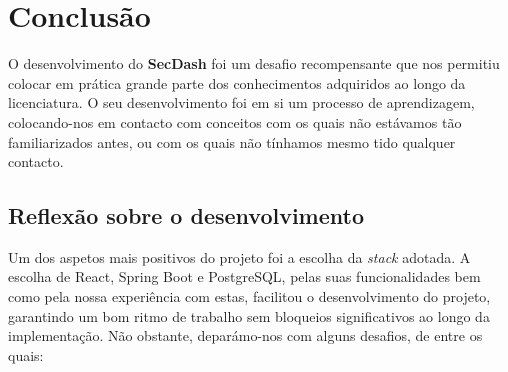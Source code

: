 \chapter{Conclusão} \label{cap:conclusao}

O desenvolvimento do \textbf{SecDash} foi um desafio recompensante que nos permitiu colocar em prática grande parte dos conhecimentos adquiridos ao longo da licenciatura. O seu desenvolvimento foi em si um processo de aprendizagem, colocando-nos em contacto com conceitos com os quais não estávamos tão familiarizados antes, ou com os quais não tínhamos mesmo tido qualquer contacto. \\

\section{Reflexão sobre o desenvolvimento}

Um dos aspetos mais positivos do projeto foi a escolha da \textit{stack} adotada. A escolha de React, Spring Boot e PostgreSQL, pelas suas funcionalidades bem como pela nossa experiência com estas, facilitou o desenvolvimento do projeto, garantindo um bom ritmo de trabalho sem bloqueios significativos ao longo da implementação. Não obstante, deparámo-nos com alguns desafios, de entre os quais:

